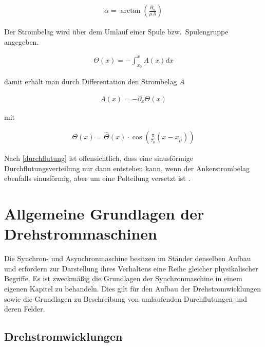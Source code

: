 \begin{align}
\alpha = \arctan(\frac{B_n}{\mu A}) \label{strombelagwinkel}
\end{align}

Der Strombelag wird über dem Umlauf einer Spule bzw.\ Spulengruppe angegeben.

\begin{align}
\Theta(x) = - \int_{x_0}^{x} A(x)dx \label{durchflutung}
\end{align}

damit erhält man durch Differentation den Strombelag $A$

\begin{align}
A(x) = -\partial_x \Theta(x) \label{Strombelag}
\end{align}

mit

\begin{align}
\Theta(x) = \hat{\Theta}(x)\cdot \cos(\frac{\pi}{\tau_p}(x-x_\mu)) \label{adurchflutung}
\end{align}

Nach \ref{durchflutung} ist offensichtlich, dass eine sinusförmige Durchflutungsverteilung nur dann entstehen kann, wenn der Ankerstrombelag ebenfalls sinusförmig, aber um eine Polteilung versetzt ist \parencite[S.~247]{mullerI2005}.


\section{Allgemeine Grundlagen der Drehstrommaschinen}\label{sec:drehstrommaschinen}

Die Synchron- und Asynchronmaschine besitzen im Ständer denselben Aufbau und erfordern zur Darstellung ihres Verhaltens eine Reihe gleicher physikalischer Begriffe.
Es ist zweckmäßig die Grundlagen der Synchronmaschine in einem eigenen Kapitel zu behandeln.
Dies gilt \insb für den Aufbau der Drehstromwicklungen sowie die Grundlagen zu Beschreibung von umlaufenden Durchflutungen und deren Felder.

\subsection{Drehstromwicklungen}

